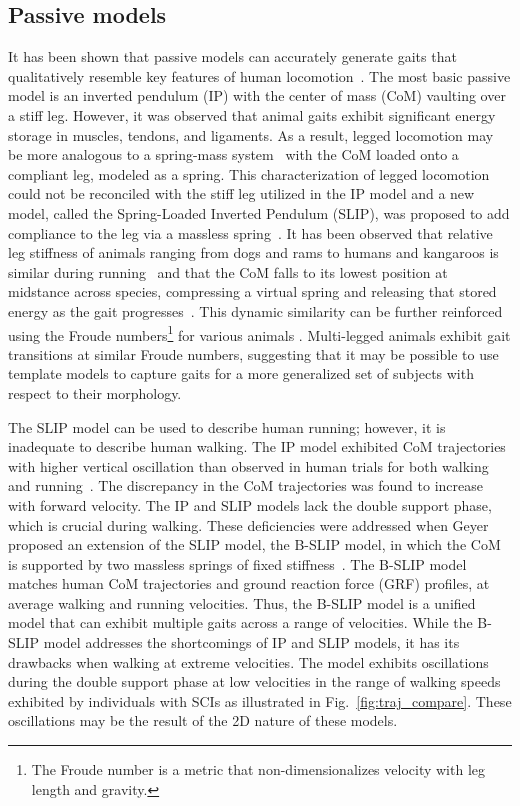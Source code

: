 \subsection{Passive models}

It has been shown that passive models can accurately generate gaits that qualitatively resemble key features of human locomotion~\cite{mochon1980ballistic}. The most basic passive model is an inverted pendulum (IP) with the center of mass (CoM) vaulting over a stiff leg. However, it was observed that animal gaits exhibit significant energy storage in muscles, tendons, and ligaments. As a result, legged locomotion may be more analogous to a spring-mass system~\cite{blickhan1989spring} with the CoM loaded onto a compliant leg, modeled as a spring. This characterization of legged locomotion could not be reconciled with the stiff leg utilized in the IP model and a new model, called the Spring-Loaded Inverted Pendulum (SLIP), was proposed to add compliance to the leg via a massless spring~\cite{blickhan1989spring}. It has been observed that relative leg stiffness of animals ranging from dogs and rams to humans and kangaroos is similar during running~\cite{blickhan1993similarity} and that the CoM falls to its lowest position at midstance across species, compressing a virtual spring and releasing that stored energy as the gait progresses~\cite{full1999templates}. This dynamic similarity can be further reinforced using the Froude numbers\footnote{The Froude number is a metric that non-dimensionalizes velocity with leg length and gravity.} for various animals \cite{alexander1984gaits}. Multi-legged animals exhibit gait transitions at similar Froude numbers, suggesting that it may be possible to use template models to capture gaits for a more generalized set of subjects with respect to their morphology.

The SLIP model can be used to describe human running; however, it is inadequate to describe human walking. The IP model exhibited CoM trajectories with higher vertical oscillation than observed in human trials for both walking and running~\cite{lee1998determinants}. The discrepancy in the CoM trajectories was found to increase with forward velocity. The IP and SLIP models lack the double support phase, which is crucial during walking. These deficiencies were addressed when Geyer proposed an extension of the SLIP model, the B-SLIP model, in which the CoM is supported by two massless springs of fixed stiffness~\cite{geyer2006compliant}. The  B-SLIP model matches human CoM trajectories and ground reaction force (GRF) profiles, at average walking and running velocities. Thus, the B-SLIP model is a unified model that can exhibit multiple gaits across a range of velocities. While the B-SLIP model addresses the shortcomings of IP and SLIP models, it has its drawbacks when walking at extreme velocities. The model exhibits oscillations during the double support phase at low velocities in the range of walking speeds exhibited by individuals with SCIs as illustrated in Fig.~\ref{fig:traj_compare}. These oscillations may be the result of the 2D nature of these models.

